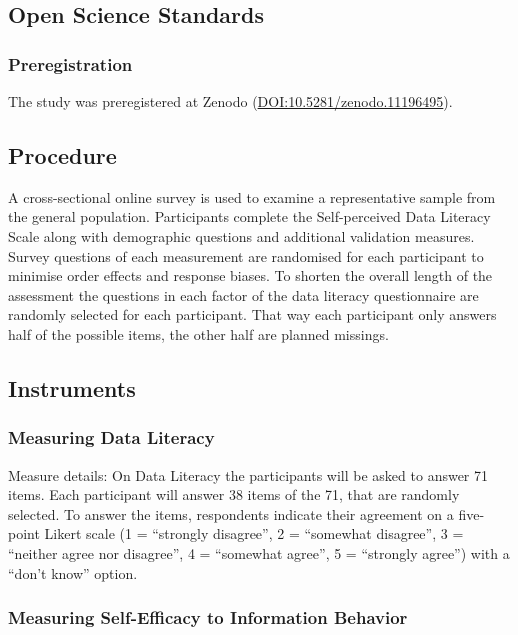 \documentclass[
  12pt,
  a4paper,
  twoside]{article}
\begin{document}
\subsection{Open Science Standards}\label{open-science-standards}

\subsubsection{Preregistration}\label{preregistration}

The study was preregistered at Zenodo
(\url{DOI:10.5281/zenodo.11196495}).

\subsection{Procedure}\label{procedure}

A cross-sectional online survey is used to examine a representative
sample from the general population. Participants complete the
Self-perceived Data Literacy Scale along with demographic questions and
additional validation measures. Survey questions of each measurement are
randomised for each participant to minimise order effects and response
biases. To shorten the overall length of the assessment the questions in
each factor of the data literacy questionnaire are randomly selected for
each participant. That way each participant only answers half of the
possible items, the other half are planned missings.

\subsection{Instruments}\label{instruments}

\subsubsection{Measuring Data Literacy}\label{measuring-data-literacy}

Measure details: On Data Literacy the participants will be asked to
answer 71 items. Each participant will answer 38 items of the 71, that
are randomly selected. To answer the items, respondents indicate their
agreement on a five-point Likert scale (1 = ``strongly disagree'', 2 =
``somewhat disagree'', 3 = ``neither agree nor disagree'', 4 =
``somewhat agree'', 5 = ``strongly agree'') with a ``don't know''
option.

\subsubsection{Measuring Self-Efficacy to Information
Behavior}\label{measuring-self-efficacy-to-information-behavior}
\end{document}
